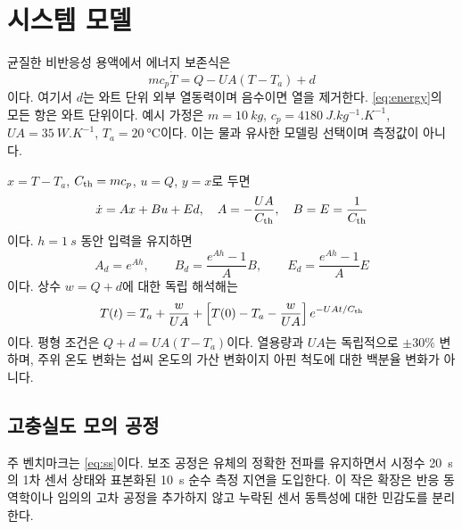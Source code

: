 \section{시스템 모델}\label{sec:model}
균질한 비반응성 용액에서 에너지 보존식은
\begin{equation}
m c_p \dot T=Q-UA(T-T_a)+d \label{eq:energy}
\end{equation}
이다. 여기서 $d$는 와트 단위 외부 열동력이며 음수이면 열을 제거한다. \cref{eq:energy}의 모든 항은 와트 단위이다. 예시 가정은 $m=\SI{10}{kg}$, $c_p=\SI{4180}{J.kg^{-1}.K^{-1}}$, $UA=\SI{35}{W.K^{-1}}$, $T_a=\SI{20}{\celsius}$이다. 이는 물과 유사한 모델링 선택이며 측정값이 아니다.

$x=T-T_a$, $C_{\rm th}=mc_p$, $u=Q$, $y=x$로 두면
\begin{equation}
\dot x=Ax+Bu+Ed,\quad A=-\frac{UA}{C_{\rm th}},\quad B=E=\frac{1}{C_{\rm th}} \label{eq:ss}
\end{equation}
이다. $h=\SI{1}{s}$ 동안 입력을 유지하면
\begin{equation}
A_d=e^{Ah},\qquad B_d=\frac{e^{Ah}-1}{A}B,\qquad E_d=\frac{e^{Ah}-1}{A}E \label{eq:zoh}
\end{equation}
이다. 상수 $w=Q+d$에 대한 독립 해석해는
\begin{equation}
T(t)=T_a+\frac{w}{UA}+\left[T(0)-T_a-\frac{w}{UA}\right]e^{-UA t/C_{\rm th}} \label{eq:analytic}
\end{equation}
이다. 평형 조건은 $Q+d=UA(T-T_a)$이다. 열용량과 $UA$는 독립적으로 $\pm30\%$ 변하며, 주위 온도 변화는 섭씨 온도의 가산 변화이지 아핀 척도에 대한 백분율 변화가 아니다.

\subsection{고충실도 모의 공정}
주 벤치마크는 \cref{eq:ss}이다. 보조 공정은 유체의 정확한 전파를 유지하면서 시정수 \SI{20}{s}의 1차 센서 상태와 표본화된 \SI{10}{s} 순수 측정 지연을 도입한다. 이 작은 확장은 반응 동역학이나 임의의 고차 공정을 추가하지 않고 누락된 센서 동특성에 대한 민감도를 분리한다.
